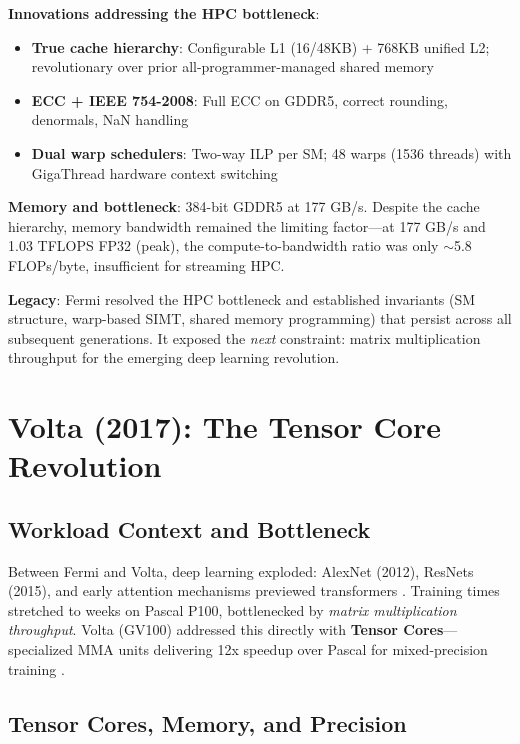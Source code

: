 \documentclass{article}
\begin{document}
\textbf{Innovations addressing the HPC bottleneck}:
\begin{itemize}
\item \textbf{True cache hierarchy}: Configurable L1 (16/48KB) + 768KB unified L2; revolutionary over prior all-programmer-managed shared memory
\item \textbf{ECC + IEEE 754-2008}: Full ECC on GDDR5, correct rounding, denormals, NaN handling
\item \textbf{Dual warp schedulers}: Two-way ILP per SM; 48 warps (1536 threads) with GigaThread hardware context switching
\end{itemize}

\textbf{Memory and bottleneck}: 384-bit GDDR5 at 177 GB/s. Despite the cache hierarchy, memory bandwidth remained the limiting factor---at 177 GB/s and 1.03 TFLOPS FP32 (peak), the compute-to-bandwidth ratio was only $\sim$5.8 FLOPs/byte, insufficient for streaming HPC.

\textbf{Legacy}: Fermi resolved the HPC bottleneck and established invariants (SM structure, warp-based SIMT, shared memory programming) that persist across all subsequent generations. It exposed the \textit{next} constraint: matrix multiplication throughput for the emerging deep learning revolution.

\section{Volta (2017): The Tensor Core Revolution}

\subsection{Workload Context and Bottleneck}

Between Fermi and Volta, deep learning exploded: AlexNet (2012), ResNets (2015), and early attention mechanisms previewed transformers \cite{bahdanau2014neural}. Training times stretched to weeks on Pascal P100, bottlenecked by \textit{matrix multiplication throughput}. Volta (GV100) addressed this directly with \textbf{Tensor Cores}---specialized MMA units delivering 12x speedup over Pascal for mixed-precision training \cite{nvidia2017volta}.

\subsection{Tensor Cores, Memory, and Precision}
\end{document}
